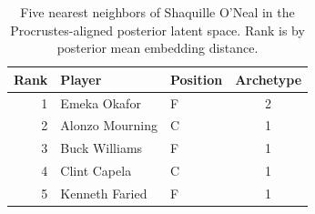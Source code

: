 \begin{table}[htbp]
  \centering\small
  \begin{tabular}{rllc}
    \toprule
    Rank & Player & Position & Archetype \\
    \midrule
    1 & Emeka Okafor & F & 2 \\
    2 & Alonzo Mourning & C & 1 \\
    3 & Buck Williams & F & 1 \\
    4 & Clint Capela & C & 1 \\
    5 & Kenneth Faried & F & 1 \\
    \bottomrule
  \end{tabular}
  \caption{Five nearest neighbors of Shaquille O'Neal in the Procrustes-aligned posterior latent space. Rank is by posterior mean embedding distance.}
  \label{tab:Shaquille_O_Neal_neighbors}
\end{table}

